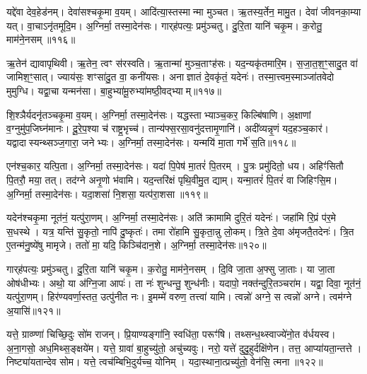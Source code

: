 यद्दे॑वा देव॒हेड॑नम्।
देवा॑सश्चकृ॒मा व॒यम्।
आदि॑त्या॒स्तस्मान्मा मुञ्चत।
ऋ॒तस्य॒र्तेन॒ मामु॒त।
देवा॑ जीवनका॒म्या यत्।
वा॒चा\-ऽनृ॑तमूदि॒म।
अ॒ग्निर्मा॒ तस्मा॒देन॑सः।
गार्‌\mbox{}ह॑पत्यः॒ प्रमु॑ञ्चतु।
दु॒रि॒ता यानि॑ चकृ॒म।
क॒रोतु॒ माम॑ने॒नसम्॥११६॥

ऋ॒तेन॑ द्यावापृथिवी।
ऋ॒तेन॒ त्वꣳ स॑रस्वति।
ऋ॒तान्मा॑ मुञ्च॒ताꣳह॑सः।
यद॒न्यकृ॑तमारि॒म।
स॒जा॒त॒श॒ꣳ॒सादु॒त वा॑ जामिश॒ꣳ॒सात्।
ज्याय॑सः॒ शꣳसा॑दु॒त वा॒ कनी॑यसः।
अनाज्ञातं दे॒वकृ॑तं॒ यदेनः॑।
तस्मा॒त्त्वम॒स्माञ्जा॑तवेदो मुमुग्धि।
यद्वा॒चा यन्मन॑सा।
बा॒हुभ्या॑मू॒रुभ्या॑मष्ठी॒वद्भ्याम्॥११७॥

शि॒श्ञैर्यदनृ॑तञ्चकृ॒मा व॒यम्।
अ॒ग्निर्मा॒ तस्मा॒देन॑सः।
यद्धस्ताभ्याञ्च॒कर॒ किल्बि॑षाणि।
अ॒क्षाणां व॒ग्नुमु॑प॒जिघ्न॑मानः।
दू॒रे॒प॒श्या च॑ राष्ट्र॒भृच्च॑।
तान्य॑फ्स॒रसा॒वनु॑दत्तामृ॒णानि॑।
अदी॑व्यन्नृ॒णं यद॒हञ्च॒कार॑।
यद्वादास्यन्थ्सञ्ज॒गारा॒ जनेभ्यः।
अ॒ग्निर्मा॒ तस्मा॒देन॑सः।
यन्मयि॑ मा॒ता गर्भे॑ स॒ति॥११८॥

एन॑श्च॒कार॒ यत्पि॒ता।
अ॒ग्निर्मा॒ तस्मा॒देन॑सः।
यदा॑ पि॒पेष॑ मा॒तरं॑ पि॒तरम्।
पु॒त्रः प्रमु॑दितो॒ धय\sn{}।
अहिꣳ॑सितौ पि॒तरौ॒ मया॒ तत्।
तद॑ग्ने अनृ॒णो भ॑वामि।
यद॒न्तरि॑क्षं पृथि॒वीमु॒त द्याम्।
यन्मा॒तरं॑ पि॒तरं॑ वा जिहिꣳसि॒म।
अ॒ग्निर्मा॒ तस्मा॒देन॑सः।
यदा॒शसा॑ नि॒शसा॒ यत्प॑रा॒शसा॥११९॥

यदेन॑श्चकृ॒मा नूत॑नं॒ यत्पु॑रा॒णम्।
अ॒ग्निर्मा॒ तस्मा॒देन॑सः।
अति॑ क्रामामि दुरि॒तं यदेनः॑।
जहा॑मि रि॒प्रं प॑र॒मे स॒धस्थे।
यत्र॒ यन्ति॑ सु॒कृतो॒ नापि॑ दु॒ष्कृतः॑।
तमा रो॑हामि सु॒कृता॒न्नु लो॒कम्।
त्रि॒ते दे॒वा अ॑मृजतै॒तदेनः॑।
त्रि॒त ए॒तन्म॑नु॒ष्ये॑षु मामृजे।
ततो॑ मा॒ यदि॒ किञ्चि॑दान॒शे।
अ॒ग्निर्मा॒ तस्मा॒देन॑सः॥१२०॥

गार्‌\mbox{}ह॑पत्यः॒ प्रमु॑ञ्चतु।
दु॒रि॒ता यानि॑ चकृ॒म।
क॒रोतु॒ माम॑ने॒नसम्।
दि॒वि जा॒ता अ॒फ्सु जा॒ताः।
या जा॒ता ओष॑धीभ्यः।
अथो॒ या अ॑ग्नि॒जा आपः॑।
ता नः॑ शुन्धन्तु॒ शुन्ध॑नीः।
यदापो॒ नक्त॑न्दुरि॒तञ्चरा॑म।
यद्वा॒ दिवा॒ नूत॑नं॒ यत्पु॑रा॒णम्।
हिर॑ण्यवर्णा॒स्तत॒ उत्पु॑नीत नः।
इ॒मम्मे॑ वरुण॒ तत्त्वा॑ यामि।
त्वन्नो॑ अग्ने॒ स त्वन्नो॑ अग्ने।
त्वम॑ग्ने अ॒यासि॑॥१२१॥\anuvakamend[अ॒ने॒नस॑मष्ठी॒वद्भ्याꣳ॑ स॒ति प॑रा॒शसा॑\-ऽऽन॒शे\-ऽग्निर्मा॒ तस्मा॒देन॑सः पुनीत न॒स्त्रीणि॑ च (यद्दे॑वा॒ देवा॑ ऋ॒तेन॑ सजातश॒ꣳ॒साद्यद्वा॒चा यद्धस्ताभ्या॒मदीव्यं॒ यन्मयि॑ मा॒ता यदा॑ पि॒पेष॒ यद॒न्तरि॑क्षं॒ यदा॒शसाऽति॑ क्रामामि त्रि॒ते दे॒वा दि॒वि जा॒ता अ॒फ्सु जा॒ता यदाप॑ इ॒मम्मे॑ वरुण॒ तत्त्वा॑ यामि॒ त्वन्नो॑ अग्ने॒ स त्वन्नो॑ अग्ने॒ त्वम॑ग्ने अ॒यासि॑।
)]

यत्ते॒ ग्राव्ण्णा॑ चिच्छि॒दुः सो॑म राजन्।
प्रि॒याण्यङ्गा॑नि॒ स्वधि॑ता॒ परूꣳ॑षि।
तथ्सन्ध॒थ्स्वाज्ये॑नो॒त व॑र्धयस्व।
अ॒ना॒गसो॒ अध॒मिथ्स॒ङ्क्षये॑म।
यत्ते॒ ग्रावा॑ बा॒हुच्यु॑तो॒ अचु॑च्यवुः।
नरो॒ यत्ते॑ दुदु॒हुर्दक्षि॑णेन।
तत्त॒ आप्या॑यता॒न्तत्ते।
निष्ट्या॑यतान्देव सोम।
यत्ते॒ त्वच॑म्बिभि॒दुर्यच्च॒ योनिम्।
यदा॒स्थाना॒त्प्रच्यु॑तो॒ वेन॑सि॒ त्मना॥१२२॥

